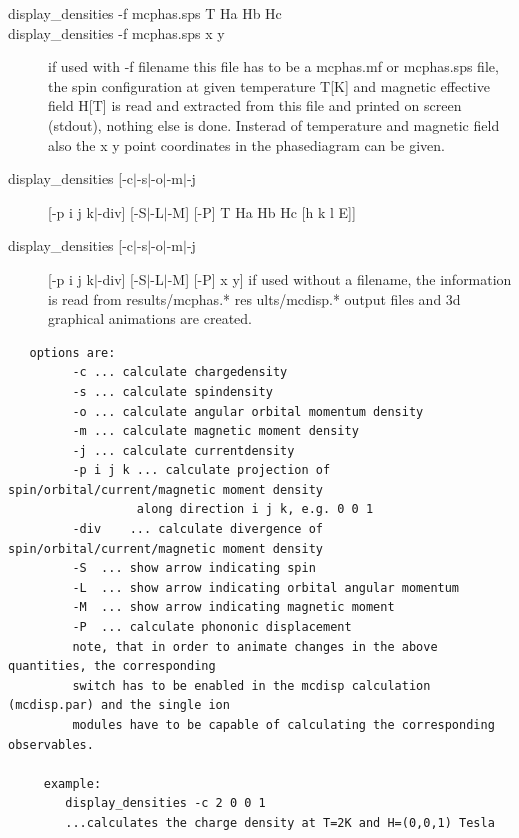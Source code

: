 \begin{description} 
\item[ display\_densities -f mcphas.sps T Ha Hb Hc]
\item[ display\_densities -f mcphas.sps x y]
 if used with -f filename this file has to be a mcphas.mf or mcphas.sps file,
the spin configuration
   at given temperature T[K] and magnetic effective field H[T]
    is read and extracted from this file and printed on screen (stdout), nothing
 else is done. Insterad of temperature and magnetic field also the x y point coordinates
in the phasediagram can be given.
\item[display\_densities [-c$|$-s$|$-o$|$-m$|$-j] [-p i j k$|$-div] [-S$|$-L$|$-M] [-P] T Ha Hb Hc [h k l E]]
\item[display\_densities [-c$|$-s$|$-o$|$-m$|$-j] [-p i j k$|$-div] [-S$|$-L$|$-M] [-P] x y]
 if used without a filename, the information is read from results/mcphas.* res
ults/mcdisp.*
   output files and 3d graphical animations are created.
\end{description} 
\begin{verbatim}
   options are:
         -c ... calculate chargedensity
         -s ... calculate spindensity
         -o ... calculate angular orbital momentum density
         -m ... calculate magnetic moment density
         -j ... calculate currentdensity
         -p i j k ... calculate projection of spin/orbital/current/magnetic moment density
                  along direction i j k, e.g. 0 0 1
         -div    ... calculate divergence of spin/orbital/current/magnetic moment density
         -S  ... show arrow indicating spin
         -L  ... show arrow indicating orbital angular momentum
         -M  ... show arrow indicating magnetic moment
         -P  ... calculate phononic displacement
         note, that in order to animate changes in the above quantities, the corresponding
         switch has to be enabled in the mcdisp calculation (mcdisp.par) and the single ion
         modules have to be capable of calculating the corresponding observables.

     example:
        display_densities -c 2 0 0 1
        ...calculates the charge density at T=2K and H=(0,0,1) Tesla
\end{verbatim}

